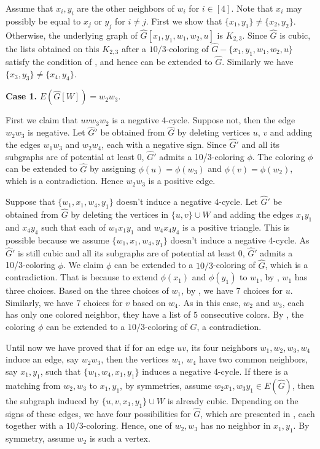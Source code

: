 \documentclass[11pt,a4paper]{article}
\makeatletter
\renewenvironment{proof}[1][\proofname]{\par
	\pushQED{\qed}%
	\normalfont \topsep6\p@\@plus6\p@\relax
	\trivlist
	\item[\hskip\labelsep
	\bfseries
	#1\@addpunct{.}]\ignorespaces
}{%
	\popQED\endtrivlist\@endpefalse
}
\theoremstyle{definition}
\makeatother
\begin{document}
\begin{proof}
	Assume that $x_i, y_i$ are the other neighbors of $w_i$ for $i \in [4]$. 
Note that $x_i$ may possibly be equal to $x_j$ or $y_j$ for $i \neq j$. 
 First we show that $\{x_{1}, y_{1}\} \neq \{x_{2}, y_{2}\}$.
 Otherwise, the underlying graph of $\widehat{G}[x_{1}, y_{1}, w_{1}, w_{2}, u]$ is $K_{2,3}$. Since $\widehat{G}$ is cubic, the lists obtained on this $K_{2,3}$ after a $10/3$-coloring of $\widehat{G}-\{x_{1}, y_{1}, w_{1}, w_{2}, u\}$ satisfy the condition of , and hence can be extended to $\widehat{G}$. 
Similarly we have $\{x_{3}, y_{3}\} \neq \{x_{4}, y_{4}\}$. 

	
	\textbf{Case 1.} $E(\widehat{G}[W])=w_2w_3$. 
	
	First we claim that $uvw_3w_2$ is a negative 4-cycle. Suppose not,  then the edge  $w_2w_3$ is negative. Let $\widehat{G}'$ be obtained from $\widehat{G}$ by deleting vertices $u$, $v$ and adding the edges $w_1w_3$ and $w_2w_4$, each with a negative sign. Since $\widehat{G}'$ and all its subgraphs are of potential at least 0, $\widehat{G}'$ admits a 10/3-coloring $\phi$. The coloring  $\phi$ can be extended to $\widehat{G}$ by assigning $\phi(u)=\phi(w_3)$ and $\phi(v)=\phi(w_2)$, which is a contradiction. Hence $w_2w_3$ is a positive edge.
	
	Suppose that $\{w_{1}, x_{1}, w_{4}, y_{1}\}$ doesn't induce a negative 4-cycle. Let $\widehat{G}'$ be obtained from $\widehat{G}$ by deleting the vertices in $\{u,v\}\cup W$ and adding the edges $x_1y_1$ and $x_4y_4$ such that each of $w_1x_1y_1$ and $w_4x_4y_4$ is a positive triangle.  This is possible because we assume $\{w_{1}, x_{1}, w_{4}, y_{1}\}$ doesn't induce a negative 4-cycle.  As $\widehat{G}'$ is still cubic and all its subgraphs are of potential at least 0, $\widehat{G}'$ admits a 10/3-coloring $\phi$.  We claim $\phi$ can be extended to a $10/3$-coloring of $\widehat{G}$, which is a contradiction. That is because to  extend $\phi(x_1)$ and $\phi(y_1)$ to $w_1$, by , $w_1$ has three choices. Based on the three choices of $w_1$, by , we have 7 choices for $u$. Similarly, we have 7 choices for $v$ based on $w_4$. As in this case,  $w_{2}$ and $w_{3}$, each has only one colored neighbor, they have a list of $5$ consecutive colors. By  , the coloring $\phi$ can be extended to a $10/3$-coloring of $\widehat{G}$, a contradiction. 

	Until now we have proved that  if for an edge $uv$, its four neighbors $w_1,w_2,w_3,w_4$  induce an edge, say $w_{2}w_{3}$, then the vertices $w_{1}$, $w_{4}$ have two common neighbors, say $x_{1}, y_{1}$, such that $\{w_{1}, w_{4}, x_{1}, y_{1}\}$ induces a negative 4-cycle.  If there is a matching from $w_{2}, w_{3}$ to $x_{1}, y_{1}$, by symmetries, assume $w_{2}x_{1}, w_{3}y_{1}\in E(\widehat{G})$, then the subgraph induced by $\{u, v, x_{1}, y_{1}\}\cup W$ is already cubic. Depending on the signs of these edges, we have four possibilities for $\widehat{G}$, which are presented in , each together with a $10/3$-coloring. Hence, one of $w_{2}, w_{3}$ has no neighbor in $x_{1}, y_{1}$. By symmetry, assume $w_{2}$ is such a vertex.
	

\end{proof}
\end{document}
